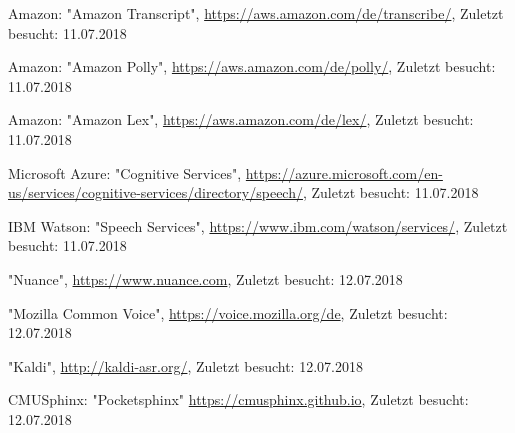 \documentclass[journal]{IEEEtran}
\begin{document}
\begin{thebibliography}{1}
Amazon: "Amazon Transcript",
\url{https://aws.amazon.com/de/transcribe/},
Zuletzt besucht: 11.07.2018

Amazon: "Amazon Polly",
\url{https://aws.amazon.com/de/polly/},
Zuletzt besucht: 11.07.2018

Amazon: "Amazon Lex",
\url{https://aws.amazon.com/de/lex/},
Zuletzt besucht: 11.07.2018

Microsoft Azure: "Cognitive Services",
\url{https://azure.microsoft.com/en-us/services/cognitive-services/directory/speech/},
Zuletzt besucht: 11.07.2018

IBM Watson: "Speech Services",
\url{https://www.ibm.com/watson/services/},
Zuletzt besucht: 11.07.2018

"Nuance",
\url{https://www.nuance.com},
Zuletzt besucht: 12.07.2018

"Mozilla Common Voice",
\url{https://voice.mozilla.org/de},
Zuletzt besucht: 12.07.2018

"Kaldi",
\url{http://kaldi-asr.org/},
Zuletzt besucht: 12.07.2018

CMUSphinx: "Pocketsphinx"
\url{https://cmusphinx.github.io},
Zuletzt besucht: 12.07.2018
\end{thebibliography}
\end{document}
